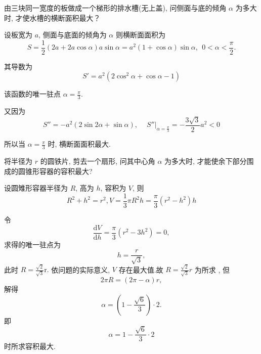 \begin{problem} 由三块同一宽度的板做成一个梯形的排水槽(无上盖), 问侧面与底的倾角
$\alpha$ 为多大时, 才使水槽的横断面积最大？

\begin{solution} 设板宽为 $a$, 侧面与底面的倾角为 $\alpha$ 则横断面面积为
$$S = \frac{1}{2}\left( 2a + 2a\cos\alpha \right)a\sin\alpha = a^{2}\left( 1 + \cos\alpha \right)\sin\alpha,\ \  0 < \alpha < \frac{\pi}{2}.$$

其导数为
$$S' = a^{2}\left( 2\cos^{2}\alpha + \cos\alpha - 1 \right)$$

该函数的唯一驻点 $\alpha = \frac{\pi}{3}$.

又因为
$$S'' = - a^{2}\left( 2\sin 2\alpha + \sin\alpha \right),\left. \ \quad S'' \right|_{\alpha = \frac{\pi}{3}} = - \frac{3\sqrt{3}}{2}a^{2} < 0$$

所以当 $\displaystyle \alpha = \frac{\pi}{3}$ 时, 横断面面积最大.
\end{solution}

\end{problem}           


\begin{problem} 将半径为 $r$ 的圆铁片, 剪去一个扇形, 问其中心角 $\alpha$
为多大时, 才能使余下部分围成的圆锥形容器的容积最大?

\begin{solution} 设圆雉形容器半径为 $R$, 高为 $h$, 容积为 $V$, 则
$$R^{2} + h^{2} = r^{2},V = \frac{1}{3}\pi R^{2}h = \frac{\pi}{3}\left( r^{2} - h^{2} \right)h$$

令
$$\frac{\text{d}V}{\text{d}h} = \frac{\pi}{3}\left( r^{2} - 3h^{2} \right) = 0,$$
求得的唯一驻点为 $$h = \frac{r}{\sqrt{3}},$$ 此时
$\displaystyle R = \frac{\sqrt{2}}{\sqrt{3}}\text{r.}$ 依问题的实际意义, $V$
存在最大值.故 $\displaystyle R = \frac{\sqrt{2}}{\sqrt{3}}r$ 为所求 , 但
$$2\pi R = \left( 2\pi - \alpha \right)r,$$ 解得
$$\alpha = \left( 1 - \frac{\sqrt{6}}{3} \right) \cdot 2.$$ 即
$$\alpha = 1 - \frac{\sqrt{6}}{3} \cdot 2$$ 时所求容积最大.
\end{solution}

\end{problem}




